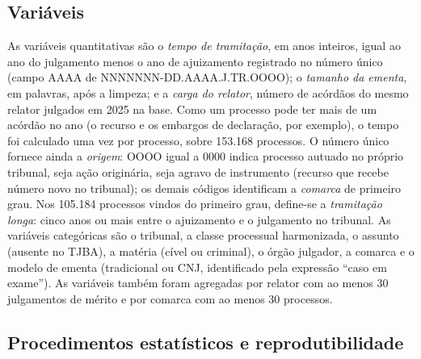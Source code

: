 \documentclass[conference]{IEEEtran}
\begin{document}
\subsection{Variáveis}

As variáveis quantitativas são o \emph{tempo de tramitação}, em anos inteiros,
igual ao ano do julgamento menos o ano de ajuizamento registrado no número
único (campo AAAA de NNNNNNN-DD.AAAA.J.TR.OOOO); o \emph{tamanho da ementa}, em
palavras, após a limpeza; e a \emph{carga do relator}, número de acórdãos do
mesmo relator julgados em 2025 na base. Como um processo pode ter mais de um
acórdão no ano (o recurso e os embargos de declaração, por exemplo), o tempo
foi calculado uma vez por processo, sobre 153.168 processos. O número único
fornece ainda a \emph{origem}: OOOO igual a 0000 indica processo autuado no
próprio tribunal, seja ação originária, seja agravo de instrumento (recurso que
recebe número novo no tribunal); os demais códigos identificam a
\emph{comarca} de primeiro grau. Nos
105.184 processos vindos do primeiro grau, define-se a \emph{tramitação longa}:
cinco anos ou mais entre o ajuizamento e o julgamento no tribunal. As variáveis
categóricas são o tribunal, a classe processual harmonizada, o assunto
(ausente no TJBA), a matéria (cível ou criminal), o órgão julgador, a comarca e
o modelo de ementa (tradicional ou CNJ, identificado pela expressão ``caso em
exame''). As variáveis também foram agregadas por relator com ao menos 30
julgamentos de mérito e por comarca com ao menos 30 processos.

\subsection{Procedimentos estatísticos e reprodutibilidade}
\end{document}
